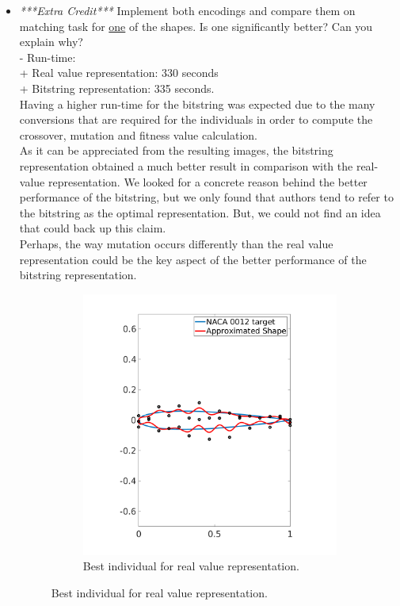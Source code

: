 \documentclass{article}
\begin{document}
\begin{itemize}
	\item \textit{***Extra Credit***} Implement both encodings and compare them on matching task for \underline{one} of the shapes. Is one significantly better? Can you explain why?
	\\\color{blue}
	- Run-time:\\
	+ Real value representation: 330 seconds\\
	+ Bitstring representation: 335 seconds.\\
	Having a higher run-time for the bitstring was expected due to the many conversions that are required for the individuals in order to compute the crossover, mutation and fitness value calculation. \\
	
	As it can be appreciated from the resulting images, the bitstring representation obtained a much better result in comparison with the real-value representation. We looked for a concrete reason behind the better performance of the bitstring, but we only found that authors tend to refer to the bitstring as the optimal representation. But, we could not find an idea that could back up this claim. \\
	
	Perhaps, the way mutation occurs differently than the real value representation could be the key aspect of the better performance of the bitstring representation.
	 
	\color{black}
	
	\begin{figure}[http]
		\centering
		\begin{subfigure}[b]{.52\linewidth}
			\includegraphics[scale = 0.3]{img/Best_real_GA_20_20000.png}
			\caption{Best individual for real value representation.}
			

\end{subfigure}
\end{figure}
\end{itemize}
\end{document}
